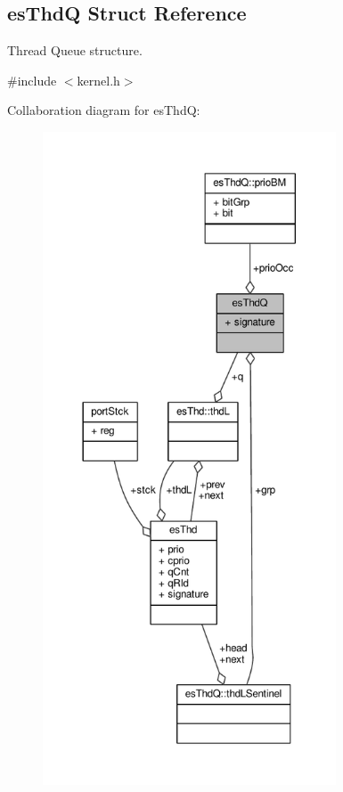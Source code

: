 \hypertarget{structesThdQ}{\subsection{es\-Thd\-Q Struct Reference}
\label{structesThdQ}
}


Thread Queue structure.  




{\ttfamily \#include $<$kernel.\-h$>$}



Collaboration diagram for es\-Thd\-Q\-:\nopagebreak
\begin{figure}[H]
\begin{center}
\leavevmode
\includegraphics[height=550pt]{structesThdQ__coll__graph}
\end{center}
\end{figure}
